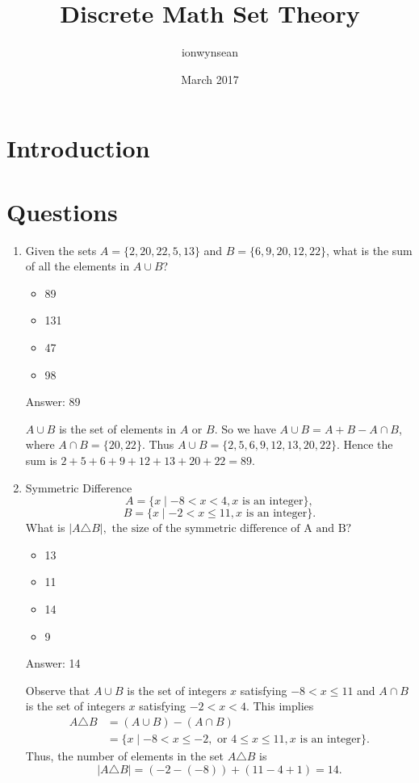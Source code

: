 \documentclass{article}
\title{Discrete Math Set Theory}
\author{ionwynsean }
\date{March 2017}
\begin{document}
\maketitle

\section{Introduction}

\section{Questions}

\begin{enumerate}
    \item Given the sets \(A = \{2, 20, 22, 5, 13\}\) and \(B = \{6, 9, 20, 12, 22\}\), what is the sum of all the elements in \(A \cup B\)?
    
    \begin{itemize}
        \item 89
        \item 131
        \item 47
        \item 98
    \end{itemize}
    
    Answer: 89
    
     \(A \cup B\) is the set of elements in  \(A\) or  \(B\). So we have  \(A \cup B = A + B - A \cap B\), where  \(A \cap B = \{20, 22\}\). Thus  \(A \cup B = \{2, 5, 6, 9, 12, 13, 20, 22 \}\). Hence the sum is  \(2 + 5 + 6 + 9 + 12 + 13 + 20 + 22 = 89\).
     
     \item  Symmetric Difference
     \[
     A =\{x \mid -8 < x < 4, x \text{ is an integer} \},
     \]
     \[
     B =\{x \mid -2 < x \leq 11, x \text{ is an integer} \}.\]
What is  \( \lvert A \triangle B \rvert, \text{ the size of the symmetric difference of A and B} ?\)

    \begin{itemize}
        \item 13
        \item 11
        \item 14
        \item 9
    \end{itemize}
     
     Answer: 14
     
     Observe that  \(A \cup B\) is the set of integers  \(x\) satisfying  \( - 8 < x \leq 11\) and  \(A \cap B\) is the set of integers  \(x\) satisfying  \(-2 < x < 4.\) This implies
 \[\begin{aligned} A \triangle B &= (A \cup B)-(A \cap B) \\ &= \{x \mid -8 < x \leq -2, \text{ or } 4 \leq x \leq 11, x \text{ is an integer} \}. \end{aligned} \]
Thus, the number of elements in the set  \(A \triangle B\) is
 \[ \lvert A \triangle B \rvert = (-2-(-8))+(11-4+1)=14.\]
 

\end{enumerate}
\end{document}
